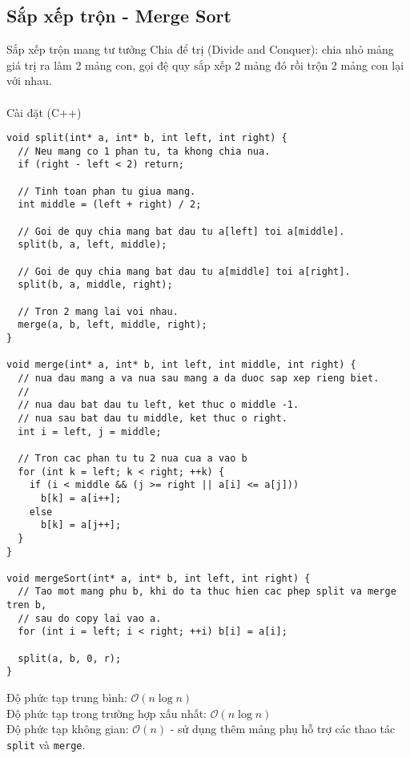 \documentclass[]{article}
\begin{document}
\subsection{Sắp xếp trộn - Merge Sort}
Sắp xếp trộn mang tư tưởng Chia để trị (Divide and Conquer): chia nhỏ mảng giá trị ra làm 2 mảng con, gọi đệ quy sắp xếp 2 mảng đó rồi trộn 2 mảng con lại với nhau.
\\\\
Cài đặt (C++)
\begin{lstlisting}
void split(int* a, int* b, int left, int right) {
  // Neu mang co 1 phan tu, ta khong chia nua.
  if (right - left < 2) return;

  // Tinh toan phan tu giua mang.
  int middle = (left + right) / 2;

  // Goi de quy chia mang bat dau tu a[left] toi a[middle].
  split(b, a, left, middle);

  // Goi de quy chia mang bat dau tu a[middle] toi a[right].
  split(b, a, middle, right);

  // Tron 2 mang lai voi nhau.
  merge(a, b, left, middle, right);
}

void merge(int* a, int* b, int left, int middle, int right) {
  // nua dau mang a va nua sau mang a da duoc sap xep rieng biet.
  //
  // nua dau bat dau tu left, ket thuc o middle -1.
  // nua sau bat dau tu middle, ket thuc o right.
  int i = left, j = middle;

  // Tron cac phan tu tu 2 nua cua a vao b
  for (int k = left; k < right; ++k) {
    if (i < middle && (j >= right || a[i] <= a[j]))
      b[k] = a[i++];
    else
      b[k] = a[j++];
  }
}

void mergeSort(int* a, int* b, int left, int right) {
  // Tao mot mang phu b, khi do ta thuc hien cac phep split va merge tren b,
  // sau do copy lai vao a.
  for (int i = left; i < right; ++i) b[i] = a[i];

  split(a, b, 0, r);
}
\end{lstlisting}
Độ phức tạp trung bình: $\mathcal{O}(n \log n)$
\\
Độ phức tạp trong trường hợp xấu nhất: $\mathcal{O}(n \log n)$
\\
Độ phức tạp không gian: $\mathcal{O}(n)$ - sử dụng thêm mảng phụ hỗ trợ các thao tác \texttt{split} và \texttt{merge}.
\end{document}
